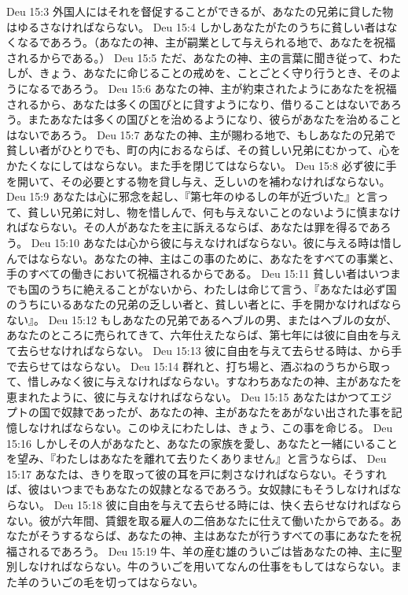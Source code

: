 Deu 15:3  外国人にはそれを督促することができるが、あなたの兄弟に貸した物はゆるさなければならない。
Deu 15:4  しかしあなたがたのうちに貧しい者はなくなるであろう。（あなたの神、主が嗣業として与えられる地で、あなたを祝福されるからである。）
Deu 15:5  ただ、あなたの神、主の言葉に聞き従って、わたしが、きょう、あなたに命じることの戒めを、ことごとく守り行うとき、そのようになるであろう。
Deu 15:6  あなたの神、主が約束されたようにあなたを祝福されるから、あなたは多くの国びとに貸すようになり、借りることはないであろう。またあなたは多くの国びとを治めるようになり、彼らがあなたを治めることはないであろう。
Deu 15:7  あなたの神、主が賜わる地で、もしあなたの兄弟で貧しい者がひとりでも、町の内におるならば、その貧しい兄弟にむかって、心をかたくなにしてはならない。また手を閉じてはならない。
Deu 15:8  必ず彼に手を開いて、その必要とする物を貸し与え、乏しいのを補わなければならない。
Deu 15:9  あなたは心に邪念を起し、『第七年のゆるしの年が近づいた』と言って、貧しい兄弟に対し、物を惜しんで、何も与えないことのないように慎まなければならない。その人があなたを主に訴えるならば、あなたは罪を得るであろう。
Deu 15:10  あなたは心から彼に与えなければならない。彼に与える時は惜しんではならない。あなたの神、主はこの事のために、あなたをすべての事業と、手のすべての働きにおいて祝福されるからである。
Deu 15:11  貧しい者はいつまでも国のうちに絶えることがないから、わたしは命じて言う、『あなたは必ず国のうちにいるあなたの兄弟の乏しい者と、貧しい者とに、手を開かなければならない』。
Deu 15:12  もしあなたの兄弟であるヘブルの男、またはヘブルの女が、あなたのところに売られてきて、六年仕えたならば、第七年には彼に自由を与えて去らせなければならない。
Deu 15:13  彼に自由を与えて去らせる時は、から手で去らせてはならない。
Deu 15:14  群れと、打ち場と、酒ぶねのうちから取って、惜しみなく彼に与えなければならない。すなわちあなたの神、主があなたを恵まれたように、彼に与えなければならない。
Deu 15:15  あなたはかつてエジプトの国で奴隷であったが、あなたの神、主があなたをあがない出された事を記憶しなければならない。このゆえにわたしは、きょう、この事を命じる。
Deu 15:16  しかしその人があなたと、あなたの家族を愛し、あなたと一緒にいることを望み、『わたしはあなたを離れて去りたくありません』と言うならば、
Deu 15:17  あなたは、きりを取って彼の耳を戸に刺さなければならない。そうすれば、彼はいつまでもあなたの奴隷となるであろう。女奴隷にもそうしなければならない。
Deu 15:18  彼に自由を与えて去らせる時には、快く去らせなければならない。彼が六年間、賃銀を取る雇人の二倍あなたに仕えて働いたからである。あなたがそうするならば、あなたの神、主はあなたが行うすべての事にあなたを祝福されるであろう。
Deu 15:19  牛、羊の産む雄のういごは皆あなたの神、主に聖別しなければならない。牛のういごを用いてなんの仕事をもしてはならない。また羊のういごの毛を切ってはならない。

